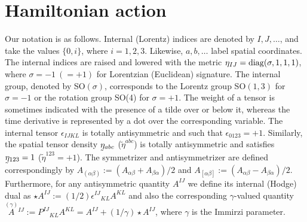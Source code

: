 \documentclass[aps,prd,reprint,showpacs,longbibliography,superscriptaddress, groupedaddres,
titlepage,nofootinbib]{revtex4-1} %
\begin{document}
\section{Hamiltonian action}
Our notation is as follows. Internal (Lorentz) indices are denoted by $I,J,\dots$, and take the values $\{0,i\}$, where $i=1,2,3$.  Likewise, $a,b,\dots$ label spatial coordinates. The internal indices are raised and lowered with the metric $\eta_{IJ}=\rm{diag}(\sigma,1,1,1)$, where $\sigma=-1\ (=+1)$ for Lorentzian (Euclidean) signature. The internal group, denoted by SO$(\sigma)$, corresponds to the Lorentz group SO$(1,3)$ for $\sigma=-1$ or the rotation group SO(4) for $\sigma=+1$. The weight of a tensor is sometimes indicated with the presence of a tilde over or below it, whereas the time derivative is represented by a dot over the corresponding variable. The internal tensor $\epsilon_{IJKL}$ is totally antisymmetric and such that $\epsilon_{0123}=+1$. Similarly, the spatial tensor density $\underaccent{\tilde}{\eta}_{abc}$ ($\tilde{\eta}^{abc}$) is totally antisymmetric and satisfies $\underaccent{\tilde}{\eta}_{123}=1$ ($\tilde{\eta}^{123}=+1$). The symmetrizer and antisymmetrizer are defined correspondingly by $A_{(\alpha\beta)}:=(A_{\alpha\beta}+A_{\beta\alpha})/2$ and $A_{[\alpha\beta]}:=(A_{\alpha\beta}-A_{\beta\alpha})/2$. Furthermore, for any antisymmetric quantity $A^{IJ}$ we define its internal (Hodge) dual as $\star A^{IJ}:=(1/2)\epsilon^{IJ}{}_{KL}A^{KL}$ and also the corresponding $\gamma$-valued quantity $\stackrel{(\gamma)}{A} {}^{IJ}:=P^{IJ}{}_{KL}A^{KL}=A^{IJ}+(1/\gamma)\star A^{IJ}$, where $\gamma$ is the Immirzi parameter. %
\end{document}
